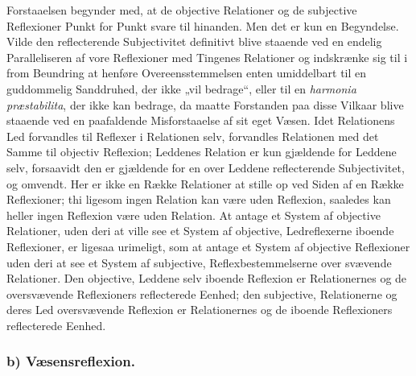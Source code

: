 \documentclass[11pt]{book}
\newcommand{\opage}[1]{\marginnote{\footnotesize\textit{[#1]}}}
\begin{document}
Forstaaelsen begynder med, at de objective Relationer og de subjective Reflexioner Punkt for Punkt svare til hinanden. Men det er kun en Begyndelse. Vilde den reflecterende Subjectivitet definitivt blive staaende ved en endelig Paralleliseren af vore Reflexioner med Tingenes Relationer og indskrænke sig til i from Beundring at henføre Overeensstemmelsen enten umiddelbart til en guddommelig Sanddruhed, der ikke „vil bedrage“, eller til en \textit{harmonia præstabilita}, der ikke kan bedrage, da maatte Forstanden paa disse Vilkaar blive staaende ved en paafaldende Misforstaaelse af sit eget Væsen. Idet Relationens Led forvandles til Reflexer i Relationen selv, forvandles Relationen med det Samme til objectiv Reflexion; Leddenes Relation er kun gjældende for Leddene selv, forsaavidt den er gjældende for en over Leddene reflecterende Subjectivitet, og omvendt. Her er ikke en Række Relationer at stille op ved Siden af en Række Reflexioner; thi ligesom ingen Relation kan være uden Reflexion, saaledes kan heller ingen Reflexion være uden Relation. At antage et System af objective Relationer, uden deri at ville see et System af objective, Ledreflexerne iboende Reflexioner, er ligesaa urimeligt, som at antage et System af objective Reflexioner uden deri at see et System af subjective, Reflexbestemmelserne over\-%
\opage{76} \setcounter{footnote}{0}%
svævende Relationer. Den objective, Leddene selv iboende Reflexion er Relationernes og de oversvævende Reflexioners reflecterede Eenhed; den subjective, Relationerne og deres Led oversvævende Reflexion er Relationernes og de iboende Reflexioners reflecterede Eenhed.

\subsubsection*{b) Væsensreflexion.}
\end{document}
